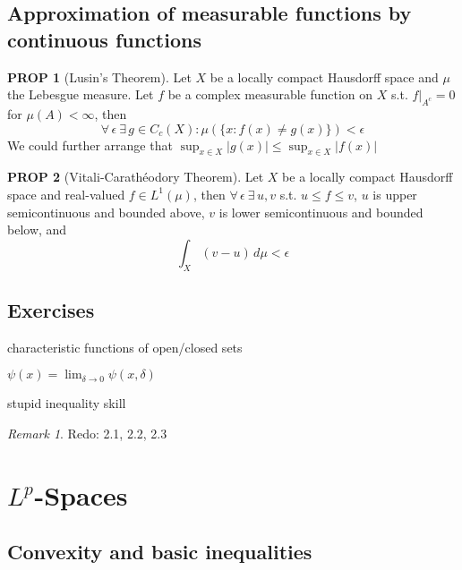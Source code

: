 \documentclass[hidelinks,10pt]{article}
\theoremstyle{definition}
\theoremstyle{dotles}
\newenvironment{exercise}[1]
  {\renewcommand\theinnercustomex{#1}\innercustomex}
  {\endinnercustomex}
\theoremstyle{dotless}
\newtheorem{proposition}{PROP}[section]
\theoremstyle{remark}
\newtheorem*{remark}{Remark}
\begin{document}
\subsection{Approximation of measurable functions by continuous functions}

\begin{proposition}[Lusin's Theorem]Let $X$ be a locally compact Hausdorff space and $\mu$ the Lebesgue measure. Let $f$ be a complex measurable function on $X$ s.t. $f|_{A^c}=0$ for $\mu(A)<\infty$, then
\[\forall\,\epsilon\ \exists\,g\in C_c(X):\mu(\{x:f(x)\neq g(x)\})<\epsilon\]
We could further arrange that $\sup_{x\in X}|g(x)|\leq\sup_{x\in X}|f(x)|$
\end{proposition}

\begin{proposition}[Vitali-Carathéodory Theorem]Let $X$ be a locally compact Hausdorff space and real-valued $f\in L^1(\mu)$, then $\forall\,\epsilon\ \exists\,u,v$ s.t. $u\leq f\leq v$, $u$ is upper semicontinuous and bounded above, $v$ is lower semicontinuous and bounded below, and
\[\int_X(v-u)\,d\mu<\epsilon\]
\end{proposition}

\subsection*{Exercises}

\begin{exercise}{2.1}
characteristic functions of open/closed sets
\end{exercise}

\begin{exercise}{2.2}
$\psi(x)=\lim_{\delta\to0}\psi(x,\delta)$
\end{exercise}

\begin{exercise}{2.3}
stupid inequality skill
\end{exercise}

\begin{remark}
Redo: 2.1, 2.2, 2.3
\end{remark}

\newpage

\section{$L^p$-Spaces}

\subsection{Convexity and basic inequalities}
\end{document}
